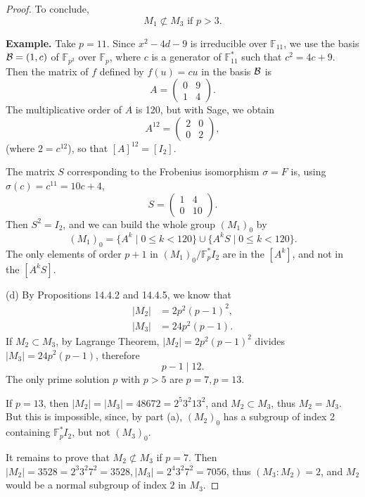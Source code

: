 \documentclass[11pt,a4paper]{article}
\newcommand{\F}{\mathbb{F}}
\begin{document}
{\begin{proof}
To conclude, 
$$M_1 \not \subset M_3 \text{ if } p>3.$$
\bigskip

{\bf Example.} Take $p=11$. Since $x^2 - 4d - 9$ is irreducible over $\F_{11}$, we use the basis ${\cal B} = (1,c)$ of $\F_{p^2}$ over $\F_p$, where $c$ is a generator of $\F_{11}^*$ such that $c^2 = 4c + 9$. Then the matrix of $f$ defined by $f(u) = c u$ in the basis $\cal B$ is
$$A = \begin{pmatrix} 0 & 9\\1 & 4 \end{pmatrix}.$$
The multiplicative order of $A$ is 120, but with Sage, we obtain
$$A^{12} =  \begin{pmatrix} 2 & 0\\0 & 2 \end{pmatrix},$$
(where $2 = c^{12}$), so that $[A]^{12} = [I_2]$.

The matrix $S$ corresponding to the Frobenius isomorphism $\sigma = F$ is, using $\sigma(c) = c^{11} = 10c + 4$, 
$$S = \begin{pmatrix} 1 & 4\\0 & 10 \end{pmatrix}.$$
Then $S^2 = I_2$, and we can build the whole group $ (M_1)_0$ by
$$(M_1)_0 = \{A^k \mid 0 \leq k < 120\} \cup \{A^k S \mid 0 \leq k < 120\}.$$
The only elements of order $p+1$ in $(M_1)_0/ \F_p^* I_2$ are in the $[A^k]$, and not in the $[A^k S]$.

\item[(d)] By Propositions 14.4.2 and 14.4.5, we know that
\begin{align*}
|M_2| &= 2p^2(p-1)^2,\\
|M_3| &= 24p^2(p-1).
\end{align*}
If $M_2 \subset M_3$, by Lagrange Theorem, $|M_2| = 2 p^2(p-1)^2$ divides  $|M_3| = 24 p^2(p-1)$, therefore
$$p-1 \mid 12.$$
The only prime solution $p$ with $p>5$ are $p=7, p=13$. 

If $p=13$, then $|M_2| = |M_3| = 48672 = 2^5 3^2 13^2$, and $M_2 \subset M_3$, thus $M_2 = M_3$. But this is impossible, since, by part (a), $(M_2)_0$ has a subgroup of index 2 containing $\F_p^* I_2$, but not $(M_3)_0$.

It remains to prove that $M_2 \not \subset M_3$ if $p=7$. Then $|M_2| = 3528 = 2^3 3^2 7^2 = 3528, |M_3| = 2^4 3^2 7^2 =7056$, thus $(M_3 : M_2) = 2$, and $M_2$ would be a normal subgroup of index $2$ in $M_3$.


\end{proof}}
\end{document}
